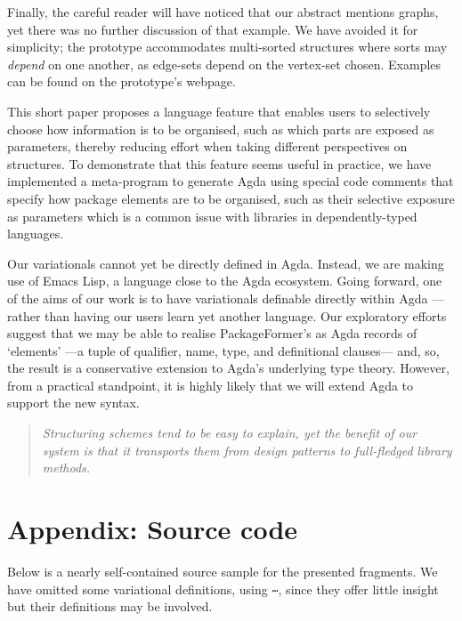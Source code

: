 \documentclass[sigplan,screen]{acmart}
\begin{document}
\noindent
Finally, the careful reader will have noticed
that our abstract mentions graphs, yet
there was no further discussion of that example.
We have avoided it for simplicity;
the prototype accommodates multi-sorted structures where
sorts may \emph{depend} on one another, as edge-sets
depend on the vertex-set chosen. Examples can be found on the prototype's
webpage.

This short paper proposes a language feature that enables users to selectively
choose how information is to be organised, such as which parts are exposed as parameters,
thereby reducing effort when taking different perspectives on structures.
To demonstrate that this feature seems useful in practice,
we have implemented a meta-program to generate Agda using special code comments
that specify how package elements are to be organised, such as their selective exposure
as parameters which is a common issue with libraries in dependently-typed languages.



\newpage


Our variationals
cannot yet be directly defined in Agda. Instead, we are making use of Emacs Lisp, a language
close to the Agda ecosystem. Going forward, one of the aims of our work is to have variationals
definable directly within Agda ---rather than having our users learn yet another language.
Our exploratory efforts suggest that we may be able to realise PackageFormer's as Agda records
of ‘elements’ ---a tuple of qualifier, name, type, and definitional clauses---
and, so, the result is a conservative extension to Agda's underlying type theory.
However, from a practical standpoint, it is highly likely that we will extend Agda to support
the new syntax.

\begin{quote}
\emph{Structuring schemes tend to be easy to explain, yet the benefit of our}
\emph{system is that it transports them from design patterns to full-fledged}
\emph{library methods.}
\end{quote}




\newpage
\section{Appendix: Source code}
\label{sec:org7caeaf8}

Below is a nearly self-contained source sample for the presented fragments.
We have omitted some variational definitions, using \texttt{⋯}, since they
offer little insight but their definitions may be involved.
\end{document}
